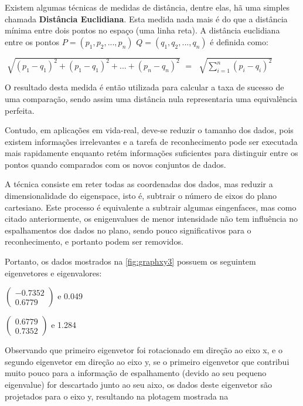 Existem algumas técnicas de medidas de distância, dentre elas, hã uma simples chamada \textbf{Distância Euclidiana}. Esta medida nada mais é do que a distância mínima entre dois pontos no espaço (uma linha reta). A distância euclidiana entre os pontos $P = (p_1, p_2, ..., p_n)$ $Q = (q_1, q_2, ..., q_n)$ é definida como:

\begin{center}
	$\sqrt[]{(p_1 - q_1)^2 + (p_1 - q_1)^2 + ... + (p_n - q_n)^2}$ $=$ $\sqrt[]{ \sum_{i=1}^{n} (p_i - q_i)^2 }$ 
\end{center}

O resultado desta medida é então utilizada para calcular a taxa de sucesso de uma comparação, sendo assim uma distância nula representaria uma equivalência perfeita.

Contudo, em aplicações em vida-real, deve-se reduzir o tamanho dos dados, pois existem informações irrelevantes e a tarefa de reconhecimento pode ser executada mais rapidamente enquanto retém informações suficientes para distinguir entre os pontos quando comparados com os novos conjuntos de dados.

A técnica consiste em reter todas as coordenadas dos dados, mas reduzir a dimensionalidade do eigenspace, isto é, subtrair o número de eixos do plano cartesiano. Este processo é equivalente a subtrair algumas eingenfaces, mas como citado anteriormente, os enigenvalues de menor intensidade não tem influência no espalhamentos dos dados no plano, sendo pouco significativos para o reconhecimento, e portanto podem ser removidos.

Portanto, os dados mostrados na  \autoref{fig:graphxy3} possuem os seguintem eigenvetores e eigenvalores:

\begin{center}
	$\begin{pmatrix} -0.7352 \\ 0.6779 \end{pmatrix}$  e 0.049
	
	$\begin{pmatrix} 0.6779 \\ 0.7352 \end{pmatrix}$  e 1.284
\end{center}

Observando que primeiro eigenvetor foi rotacionado em direção ao eixo x, e o segundo eigenvetor em direção ao eixo y, se o primeiro eigenvetor que contribui muito pouco para a informação de espalhamento (devido ao seu pequeno eigenvalue) for descartado junto ao seu aixo, os dados deste eigenvetor são projetados para o eixo y, resultando na plotagem mostrada na 

